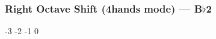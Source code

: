 \subsubsection{Right Octave Shift (4hands mode) --- \UiKey{\SET}B$\flat$2}






































-3
-2
-1
0

